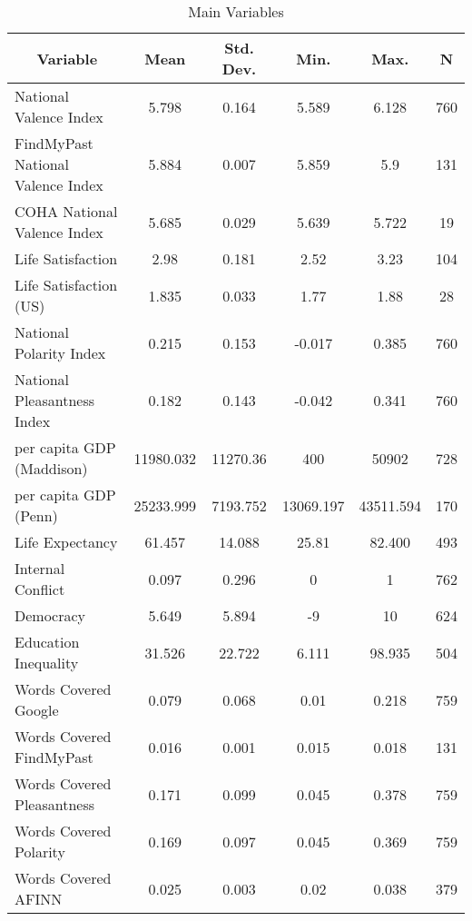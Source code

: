 
\begin{table}[htbp]\centering \caption{Main Variables \label{sumstat}}
\begin{tabular}{l c c c c c}\hline\hline
\multicolumn{1}{c}{\textbf{Variable}} & \textbf{Mean}
 & \textbf{Std. Dev.}& \textbf{Min.} &  \textbf{Max.} & \textbf{N}\\ \hline
National Valence Index & 5.798 & 0.164 & 5.589 & 6.128 & 760\\
FindMyPast National Valence Index & 5.884 & 0.007 & 5.859 & 5.9 & 131\\
COHA National Valence Index & 5.685 & 0.029 & 5.639 & 5.722 & 19\\
Life Satisfaction & 2.98 & 0.181 & 2.52 & 3.23 & 104\\
Life Satisfaction (US) & 1.835 & 0.033 & 1.77 & 1.88 & 28\\
National Polarity Index & 0.215 & 0.153 & -0.017 & 0.385 & 760\\
National Pleasantness Index & 0.182 & 0.143 & -0.042 & 0.341 & 760\\
per capita GDP (Maddison) & 11980.032 & 11270.36 & 400 & 50902 & 728\\
per capita GDP (Penn) & 25233.999 & 7193.752 & 13069.197 & 43511.594 & 170\\
Life Expectancy & 61.457 & 14.088 & 25.81 & 82.400 & 493\\
Internal Conflict & 0.097 & 0.296 & 0 & 1 & 762\\
Democracy & 5.649 & 5.894 & -9 & 10 & 624\\
Education Inequality & 31.526 & 22.722 & 6.111 & 98.935 & 504\\
Words Covered Google & 0.079 & 0.068 & 0.01 & 0.218 & 759\\
Words Covered FindMyPast & 0.016 & 0.001 & 0.015 & 0.018 & 131\\
Words Covered Pleasantness & 0.171 & 0.099 & 0.045 & 0.378 & 759\\
Words Covered Polarity & 0.169 & 0.097 & 0.045 & 0.369 & 759\\
Words Covered AFINN & 0.025 & 0.003 & 0.02 & 0.038 & 379\\
\hline\end{tabular}
\end{table}
